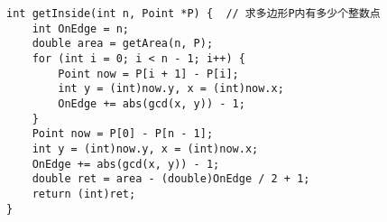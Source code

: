 \begin{lstlisting}
int getInside(int n, Point *P) {  // 求多边形P内有多少个整数点
	int OnEdge = n;
	double area = getArea(n, P);
	for (int i = 0; i < n - 1; i++) {
		Point now = P[i + 1] - P[i];
		int y = (int)now.y, x = (int)now.x;
		OnEdge += abs(gcd(x, y)) - 1;
	}
	Point now = P[0] - P[n - 1];
	int y = (int)now.y, x = (int)now.x;
	OnEdge += abs(gcd(x, y)) - 1;
	double ret = area - (double)OnEdge / 2 + 1;
	return (int)ret;
}
\end{lstlisting}
